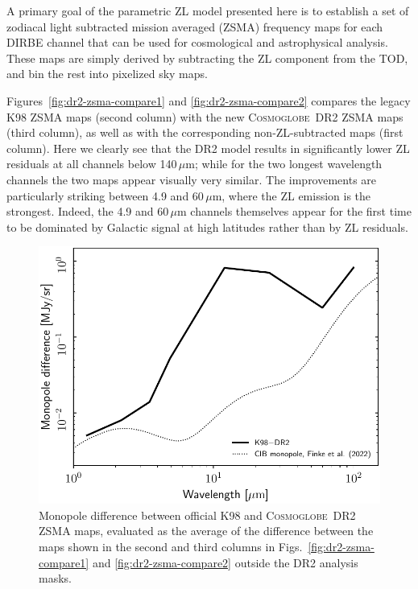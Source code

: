 \documentclass[twocolumn]{aa}
\newcommand{\cosmoglobe}{\textsc{Cosmoglobe}}
\begin{document}
A primary goal of the parametric ZL model presented here is to
establish a set of zodiacal light subtracted mission averaged (ZSMA)
frequency maps for each DIRBE channel that can be used for
cosmological and astrophysical analysis. These maps are simply derived
by subtracting the ZL component from the TOD, and bin the rest
into pixelized sky maps.

Figures~\ref{fig:dr2-zsma-compare1} and \ref{fig:dr2-zsma-compare2}
compares the legacy K98 ZSMA maps (second column) with the new
\cosmoglobe\ DR2 ZSMA maps (third column), as well as with the
corresponding non-ZL-subtracted maps (first column). Here we clearly
see that the DR2 model results in significantly lower ZL residuals at
all channels below 140\,$\mu$m; while for the two longest wavelength
channels the two maps appear visually very similar. The improvements
are particularly striking between 4.9 and 60$\,\mu$m, where the ZL
emission is the strongest. Indeed, the 4.9 and 60$\,\mu$m channels
themselves appear for the first time to be dominated by Galactic
signal at high latitudes rather than by ZL residuals.

\begin{figure}
    \centering
    \includegraphics[width=\linewidth]{figs/zodi_mean_diff_DIRBE_DR2.pdf}
    \caption{Monopole difference between official K98 and
      \cosmoglobe\ DR2 ZSMA maps, evaluated as the average of the
      difference between the maps shown in the second and third
      columns in Figs.~\ref{fig:dr2-zsma-compare1} and
      \ref{fig:dr2-zsma-compare2} outside the DR2 analysis masks.}
    \label{fig:zsma_mean}
\end{figure}
\end{document}
